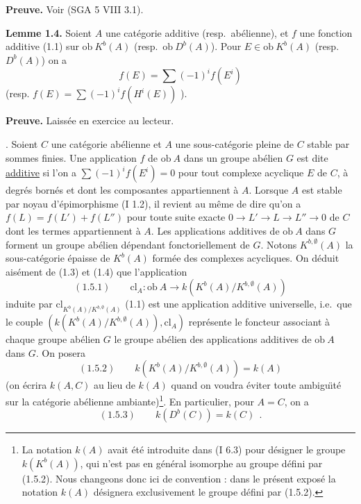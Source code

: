 \noindent\textbf{Preuve.} Voir (SGA 5 VIII 3.1).

\medskip

\noindent\textbf{Lemme 1.4.} Soient $A$ une cat\'{e}gorie additive (resp.\ ab\'{e}lienne), et $f$ une fonction additive (1.1) sur $\mathrm{ob}\ K^b(A)$ (resp.\ $\mathrm{ob}\ D^b(A)$). Pour $E \in \mathrm{ob}\ K^b(A)$ (resp.\ $D^b(A)$) on a
\[
f(E) = \sum (-1)^i f(E^i)
\]
(resp. \quad $f(E) = \sum (-1)^i f(H^i(E))$ \quad ).

\medskip

\noindent\textbf{Preuve.} Laiss\'{e}e en exercice au lecteur.

\medskip

. Soient $C$ une cat\'{e}gorie ab\'{e}lienne et $A$ une sous-cat\'{e}gorie pleine de $C$ stable par sommes finies. Une application $f$ de $\mathrm{ob}\ A$ dans un groupe ab\'{e}lien $G$ est dite \underline{additive} si l'on a $\sum (-1)^i f(E^i) = 0$ pour tout complexe acyclique $E$ de $C$, \`{a} degr\'{e}s born\'{e}s et dont les composantes appartiennent \`{a} $A$. Lorsque $A$ est stable par noyau d'\'{e}pimorphisme (I 1.2), il revient au m\^{e}me de dire qu'on a $f(L) = f(L') + f(L'')$ pour toute suite exacte $0 \longrightarrow L' \longrightarrow L \longrightarrow L'' \longrightarrow 0$ de $C$ dont les termes appartiennent \`{a} $A$. Les applications additives de $\mathrm{ob}\ A$ dans $G$ forment un groupe ab\'{e}lien d\'{e}pendant fonctoriellement de $G$. Notons $K^{b,\emptyset}(A)$ la sous-cat\'{e}gorie \'{e}paisse de $K^b(A)$ form\'{e}e des complexes acycliques. On d\'{e}duit ais\'{e}ment de (1.3) et (1.4) que l'application
\[
\mathrm{(1.5.1)} \qquad \mathrm{cl}_A : \mathrm{ob}\ A \longrightarrow k(K^b(A)/K^{b,\emptyset}(A))
\]
induite par $\mathrm{cl}_{K^b(A)/K^{b,\emptyset}(A)}$ (1.1) est une application additive universelle, i.e.\ que le couple $(k(K^b(A)/K^{b,\emptyset}(A)), \mathrm{cl}_A)$ repr\'{e}sente le foncteur associant \`{a} chaque groupe ab\'{e}lien $G$ le groupe ab\'{e}lien des applications additives de $\mathrm{ob}\ A$ dans $G$. On posera
\[
\mathrm{(1.5.2)} \qquad k(K^b(A)/K^{b,\emptyset}(A)) = k(A)
\]
(on \'{e}crira $k(A,C)$ au lieu de $k(A)$ quand on voudra \'{e}viter toute ambigu\"{\i}t\'{e} sur la cat\'{e}gorie ab\'{e}lienne ambiante)\footnote{La notation $k(A)$ avait \'{e}t\'{e} introduite dans (I 6.3) pour d\'{e}signer le groupe $k(K^b(A))$, qui n'est pas en g\'{e}n\'{e}ral isomorphe au groupe d\'{e}fini par (1.5.2). Nous changeons donc ici de convention : dans le pr\'{e}sent expos\'{e} la notation $k(A)$ d\'{e}signera exclusivement le groupe d\'{e}fini par (1.5.2).}. En particulier, pour $A = C$, on a
\[
\mathrm{(1.5.3)} \qquad k(D^b(C)) = k(C)\ \ .
\]

